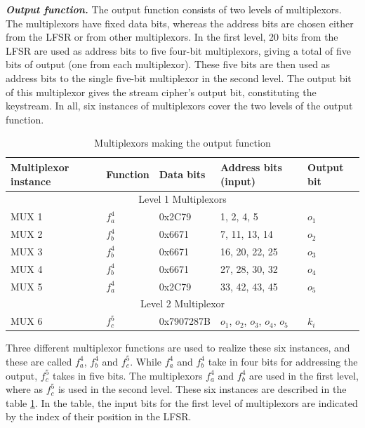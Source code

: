 \noindent \textit{\textbf{Output function.}} The output function consists of two levels of multiplexors. The multiplexors have fixed data bits, whereas the address bits are chosen either from the LFSR or from other multiplexors. In the first level, 20 bits from the LFSR are used as address bits to five four-bit multiplexors, giving a total of five bits of output (one from each multiplexor). These five bits are then used as address bits to the single five-bit multiplexor in the second level. The output bit of this multiplexor gives the stream cipher's output bit, constituting the keystream. In all, six instances of multiplexors cover the two levels of the output function.

\begin{table}[ht!]
\begin{center}
\small{
\begin{tabular}{|p{2.2cm}|l|p{2cm}|p{2.8cm}|p{1.5cm}|}
\hline 
\textbf{Multiplexor instance}	& \textbf{Function}		& \textbf{Data bits}	& \textbf{Address bits (input)}		& \textbf{Output bit}\\ \hline \hline
\multicolumn{5}{|c|}{Level 1 Multiplexors}\\ \hline \hline
MUX 1 			&	$f_a^4$			& 0x2C79			& 1, 2, 4, 5							& $o_1$\\
MUX 2 			&	$f_b^4$			& 0x6671			& 7, 11, 13, 14						& $o_2$\\
MUX 3 			&	$f_b^4$			& 0x6671			& 16, 20, 22, 25					& $o_3$\\
MUX 4 			&	$f_b^4$			& 0x6671			& 27, 28, 30, 32					& $o_4$\\
MUX 5 			&	$f_a^4$			& 0x2C79			& 33, 42, 43, 45					& $o_5$\\ \hline \hline
\multicolumn{5}{|c|}{Level 2 Multiplexor}\\ \hline \hline
MUX 6 			&	$f_c^5$			& 0x7907287B	& $o_1$, $o_2$, $o_3$, $o_4$, $o_5$		& $k_i$\\ \hline
\end{tabular}}
\end{center}
\caption{Multiplexors making the output function}
\label{tab:muxs}
\end{table}

Three different multiplexor functions are used to realize these six instances, and these are called $f_a^4$, $f_b^4$ and $f_c^5$. While $f_a^4$ and $f_b^4$ take in four bits for addressing the output, $f_c^5$ takes in five bits. The multiplexors $f_a^4$ and $f_b^4$ are used in the first level, where as $f_c^5$ is used in the second level. These six instances are described in the table \ref{tab:muxs}. In the table, the input bits for the first level of multiplexors are indicated by the index of their position in the LFSR.

